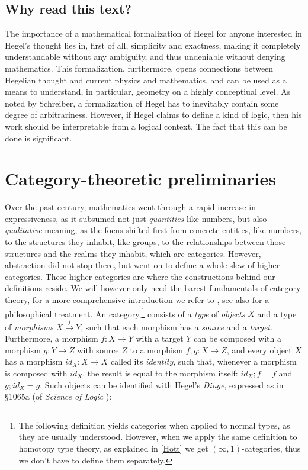 \documentclass{article}
\begin{document}
\subsection{Why read this text?}
The importance of a mathematical formalization of Hegel for anyone interested in Hegel's thought lies in, first of all,
simplicity and exactness, making it completely understandable without any ambiguity, and thus undeniable
without denying mathematics. This formalization, furthermore, opens connections between Hegelian thought and
current physics and mathematics, and can be used as a means to understand, in particular, geometry on a
highly conceptiual level. As noted by Schreiber, a formalization of Hegel has to inevitably contain some
degree of arbitrariness. However, if Hegel claims to define a kind of logic, then his work should be
interpretable from a logical context. The fact that this can be done is significant.


\section{Category-theoretic preliminaries}
Over the past century, mathematics went through a rapid increase in expressiveness, as it subsumed not
just \emph{quantities} like numbers, but also \emph{qualitative} meaning, as the focus shifted first from
concrete entities, like numbers, to the structures they inhabit, like groups, to the relationships between
those structures and the realms they inhabit, which are categories. However, abstraction did not stop
there, but went on to define a whole slew of higher categories. These higher categories are where the
constructions behind our definitions reside. We will however only need the barest fundamentals of category
theory, for a more comprehensive introduction we refer to \cite{Lein}, see also \cite{CPhil} for a 
philosophical treatment. An category,\footnote{The following definition yields categories
when applied to normal types, as they are usually understood. However, when we apply
the same definition to homotopy type theory, as explained in \ref{Hott} we get $(\infty,1)$-categories,
thus we don't have to define them separately.} consists of a \emph{type} of \emph{objects} $X$ and a type
of \emph{morphisms} $X\xrightarrow{f} Y$, such that each morphism has a \emph{source} and a \emph{target}. Furthermore, a morphism $f:X\rightarrow Y$ with a target $Y$ can be composed with a morphism $g:Y\rightarrow Z$ with source $Z$ to a morphism $f;g:X\rightarrow Z$,
and every object $X$ has a morphism $id_X:X\rightarrow X$ called its \emph{identity}, such that, whenever a morphism
is composed with $id_X$, the result is equal to the morphism itself: $id_X;f=f$ and $g;id_X=g$. Such objects
can be identified with Hegel's \emph{Dinge}, expressed as in §1065a (of \emph{Science of Logic} \cite{Sol}):
\end{document}
